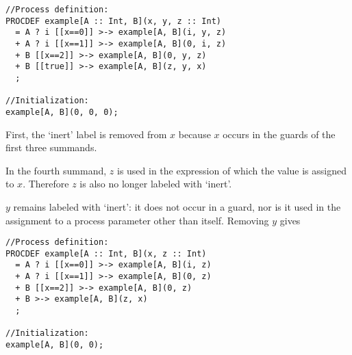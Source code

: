 \begin{lstlisting}
//Process definition:
PROCDEF example[A :: Int, B](x, y, z :: Int)
  = A ? i [[x==0]] >-> example[A, B](i, y, z)
  + A ? i [[x==1]] >-> example[A, B](0, i, z)
  + B [[x==2]] >-> example[A, B](0, y, z)
  + B [[true]] >-> example[A, B](z, y, x)
  ;

//Initialization:
example[A, B](0, 0, 0);
\end{lstlisting}

First, the `inert' label is removed from $x$ because $x$ occurs in the guards of the first three summands.

In the fourth summand, $z$ is used in the expression of which the value is assigned to $x$.
Therefore $z$ is also no longer labeled with `inert'.

$y$ remains labeled with `inert': it does not occur in a guard, nor is it used in the assignment to a process parameter other than itself.
Removing $y$ gives

\begin{lstlisting}
//Process definition:
PROCDEF example[A :: Int, B](x, z :: Int)
  = A ? i [[x==0]] >-> example[A, B](i, z)
  + A ? i [[x==1]] >-> example[A, B](0, z)
  + B [[x==2]] >-> example[A, B](0, z)
  + B >-> example[A, B](z, x)
  ;

//Initialization:
example[A, B](0, 0);
\end{lstlisting}




